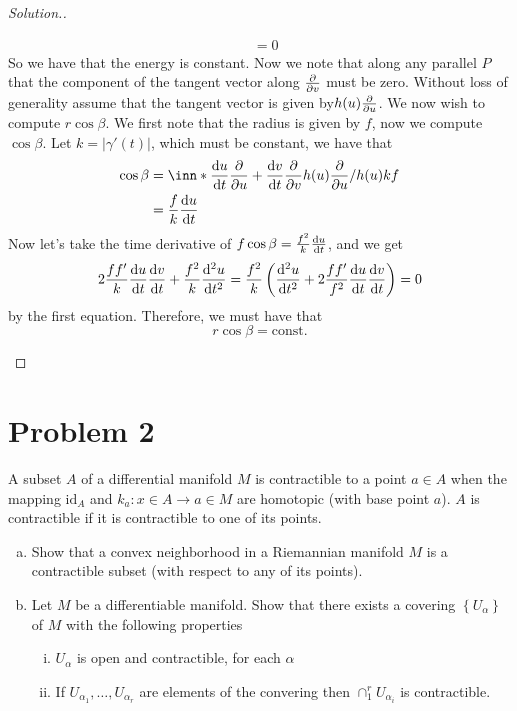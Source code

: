 \documentclass[a4paper]{article}
\begin{document}
\begin{proof}[Solution.]
\begin{enumerate}[a)]
\[\begin{aligned}
                                                    &= 0
        \end{aligned}
      \]
      So we have that the energy is constant. Now we note that along any parallel $P$ that the component of the tangent vector along $\pdv{v}$ must be zero. Without loss of generality assume that the tangent vector is given by$h(u)\pdv{u}$. We now wish to compute $r \cos \beta$. We first note that the radius is given by $f$, now we compute $\cos \beta$. Let $k = |\gamma'(t)|$, which must be constant, we have that
      \[
        \begin{aligned}
          \cos \beta &=  \inn*{\dv{u}{t} \pdv{u} + \dv{v}{t} \pdv{v}}{h(u)\pdv{u}}/ h(u)kf\\
                     &=  \frac{f}{k} \dv{u}{t}
        \end{aligned}
      \]
      Now let's take the time derivative of $f \cos \beta = \frac{f^2}{k} \dv{u}{t}$, and we get
      \[
        \begin{aligned}
          2\frac{ff'}{k}\dv{u}{t}\dv{v}{t} + \frac{f^2}{k} \dv[2]{u}{t} = \frac{f^2}{k} \left(\dv[2]{u}{t} + 2\frac{ff'}{f^2}\dv{u}{t}\dv{v}{t}\right) = 0
        \end{aligned}
      \]
      by the first equation. Therefore, we must have that
      \[
        r \cos \beta = \text{const.}
      \]
  \end{enumerate}
\end{proof}

\section*{Problem 2}%
A subset $A$ of a differential manifold $M$ is contractible to a point $a \in A$ when the mapping $\text{id}_A$ and $k_a: x \in A \rightarrow a \in M$ are homotopic (with base point $a$). $A$ is contractible if it is contractible to one of its points.

\begin{enumerate}[a)]
  \item Show that a convex neighborhood in a Riemannian manifold $M$ is a contractible subset (with respect to any of its points).
  \item Let $M$ be a differentiable manifold. Show that there exists a covering $\left\{ U_\alpha \right\}$ of $M$ with the following properties
    \begin{enumerate}[i)]
      \item $U_\alpha$ is open and contractible, for each $\alpha$
      \item If $U_{\alpha_1}, \dots, U_{\alpha_r}$ are elements of the convering then $\cap_1^r U_{\alpha_i}$ is contractible.
    \end{enumerate}
\end{enumerate}
\end{document}
